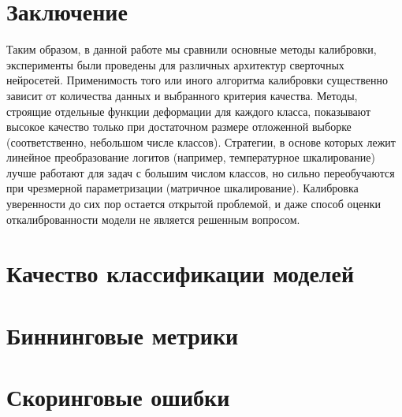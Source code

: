 \documentclass[12pt]{article}
\begin{document}
\section{Заключение}
Таким образом, в данной работе мы сравнили основные методы калибровки, эксперименты были проведены для различных архитектур сверточных нейросетей. Применимость того или иного алгоритма калибровки существенно зависит от количества данных и выбранного критерия качества. Методы, строящие отдельные функции деформации для каждого класса, показывают высокое качество только при достаточном размере отложенной выборке (соответственно, небольшом числе классов). Стратегии, в основе которых лежит линейное преобразование логитов (например, температурное шкалирование) лучше работают для задач с большим числом классов, но сильно переобучаются при чрезмерной параметризации (матричное шкалирование). Калибровка уверенности до сих пор остается открытой проблемой, и даже способ оценки откалиброванности модели не является решенным вопросом. 

\newpage
\printbibliography[
    heading=bibintoc,
    title={Список литературы}
]

\newpage
\begin{appendices}\label{sec:appendix}
\section{Качество классификации моделей}


\clearpage

\section{Биннинговые метрики}






\clearpage

\section{Скоринговые ошибки}





\end{appendices}
\end{document}
